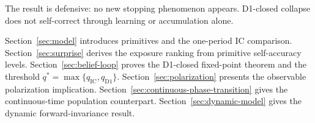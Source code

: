 The result is defensive: no new stopping phenomenon appears. D1-closed collapse does not self-correct through learning or accumulation alone.

Section~\ref{sec:model} introduces primitives and the one-period IC comparison. Section~\ref{sec:surprise} derives the exposure ranking from primitive self-accuracy levels. Section~\ref{sec:belief-loop} proves the D1-closed fixed-point theorem and the threshold $q^*=\max\{q_{\mathrm{IC}},q_{\mathrm{D1}}\}$. Section~\ref{sec:polarization} presents the observable polarization implication. Section~\ref{sec:continuous-phase-transition} gives the continuous-time population counterpart. Section~\ref{sec:dynamic-model} gives the dynamic forward-invariance result.
